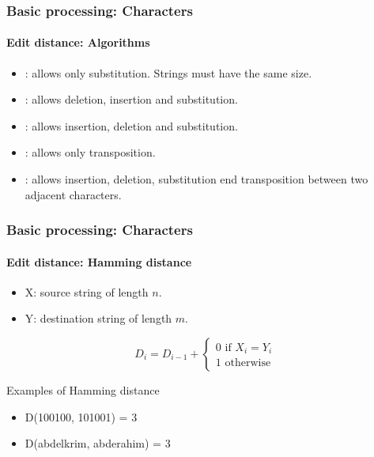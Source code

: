 \documentclass[xcolor=table]{beamer}
\begin{document}
\begin{frame}
\frametitle{Basic processing: Characters}
\framesubtitle{Edit distance: Algorithms}

\begin{itemize}
	\item {}: allows only substitution. Strings must have the same size. 
	\item {}: allows deletion, insertion and substitution.
	\item {}: allows insertion, deletion and substitution.
	\item {}: allows only transposition.
	\item {}: allows insertion, deletion, substitution end transposition between two  adjacent characters.
\end{itemize}

\end{frame}


\begin{frame}
	\frametitle{Basic processing: Characters}
	\framesubtitle{Edit distance: Hamming distance}
	
	\begin{itemize}
		\item X: source string of length $n$.
		\item Y: destination string of length $m$.
	\end{itemize}
	
	\[
	D_{i} = D_{i-1} + 
	\begin{cases}
	0 \text{ if } X_i = Y_i\\
	1 \text{ otherwise}
	\end{cases}
	\]
	
	\begin{exampleblock}{Examples of Hamming distance}
		\begin{itemize}
			\item D(100100, 101001) = 3
			\item D(abdelkrim, abderahim) = 3
		\end{itemize}
	\end{exampleblock}
	
\end{frame}
\end{document}
